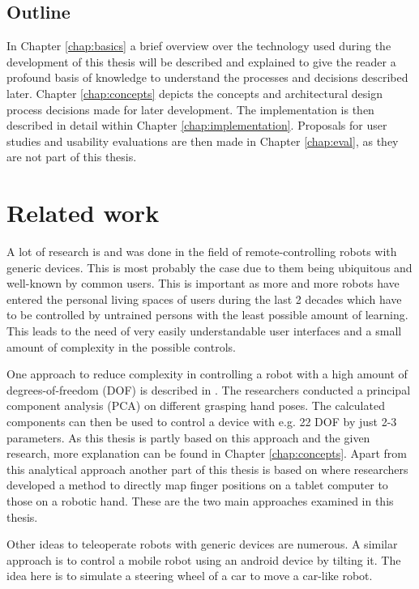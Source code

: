 \section[Outline]{Outline}

In Chapter \ref{chap:basics} a brief overview over the technology used during the development of this thesis will be described and explained to give the reader a profound basis of knowledge to understand the processes and decisions described later. Chapter \ref{chap:concepts} depicts the concepts and architectural design process decisions made for later development. The implementation is then described in detail within Chapter \ref{chap:implementation}. Proposals for user studies and usability evaluations are then made in Chapter \ref{chap:eval}, as they are not part of this thesis.

\chapter{Related work}

A lot of research is and was done in the field of remote-controlling robots with generic devices. This is most probably the case due to them being ubiquitous and well-known by common users. This is important as more and more robots have entered the personal living spaces of users during the last 2 decades\cite{Forlizzi2006} which have to be controlled by untrained persons with the least possible amount of learning. This leads to the need of very easily understandable user interfaces and a small amount of complexity in the possible controls. 

One approach to reduce complexity in controlling a robot with a high amount of degrees-of-freedom (DOF) is described in \cite{Bernardino2013}. The researchers conducted a principal component analysis (PCA) on different grasping hand poses. The calculated components can then be used to control a device with e.g. 22 DOF by just 2-3 parameters. As this thesis is partly based on this approach and the given research, more explanation can be found in Chapter \ref{chap:concepts}. Apart from this analytical approach another part of this thesis is based on \cite{conf:humanoids:TohHLBZP12} where researchers developed a method to directly map finger positions on a tablet computer to those on a robotic hand. These are the two main approaches examined in this thesis.

Other ideas to teleoperate robots with generic devices are numerous. A similar approach is to control a mobile robot using an android device by tilting it\cite{Akupati2017}. The idea here is to simulate a steering wheel of a car to move a car-like robot. 

